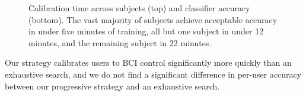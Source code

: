 \begin{figure}[!h]
  \vspace{-0.2cm}
  \centering

  
  \def\angle{0}
\def\radius{2.9}
\def\cyclelist{{"red","green","blue","yellow"}}
\newcount\cyclecount {}
\newcount\ind {}
  \vspace{0.1cm}
  
  \caption{Calibration time across subjects (top) and classifier accuracy (bottom). The vast majority of subjects achieve acceptable accuracy in under five minutes of training, all but one subject in under 12 minutes, and the remaining subject in 22 minutes. }
  \label{fig:calibration_results}
  \vspace{-0.1cm}
\end{figure}

Our strategy calibrates users to BCI control significantly more quickly than an exhaustive search, and we do not find a significant difference in per-user accuracy between our progressive strategy and an exhaustive search. 

